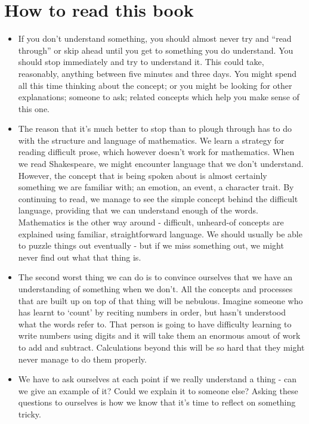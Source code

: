 \chapter{How to read this book}
\label{howto}

\begin{itemize}
\item
If you don't understand something, you should almost never try and ``read through'' or skip ahead until you get to something you do understand. You should stop immediately and try to understand it. This could take, reasonably, anything between five minutes and three days. You might spend all this time thinking about the concept; or you might be looking for other explanations; someone to ask; related concepts which help you make sense of this one.
\item
The reason that it's much better to stop than to plough through has to do with the structure and language of mathematics. We learn a strategy for reading difficult prose, which however doesn't work for mathematics. When we read Shakespeare, we might encounter language that we don't understand. However, the concept that is being spoken about is almost certainly something we are familiar with; an emotion, an event, a character trait. By continuing to read, we manage to see the simple concept behind the difficult language, providing that we can understand enough of the words. Mathematics is the other way around - difficult, unheard-of concepts are explained using familiar, straightforward language. We should usually be able to puzzle things out eventually - but if we miss something out, we might never find out what that thing is.
\item
The second worst thing we can do is to convince ourselves that we have an understanding of something when we don't. All the concepts and processes that are built up on top of that thing will be nebulous. Imagine someone who has learnt to `count' by reciting numbers in order, but hasn't understood what the words refer to. That person is going to have difficulty learning to write numbers using digits and it will take them an enormous amout of work to add and subtract. Calculations beyond this will be so hard that they might never manage to do them properly.
\item
We have to ask ourselves at each point if we really understand a thing - can we give an example of it? Could we explain it to someone else? Asking these questions to ourselves is how we know that it's time to reflect on something tricky.

\end{itemize}
